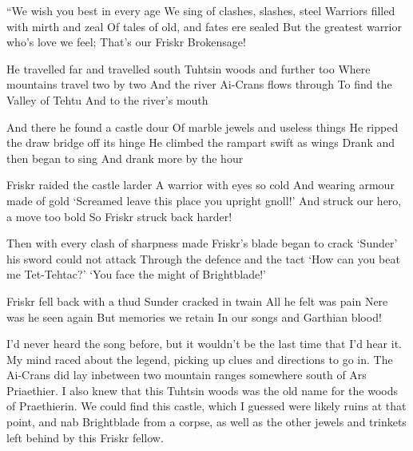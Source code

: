 \documentclass[12pt, a4paper]{book}
\begin{document}
\begin{poem}
\begin{stanza}
``We wish you best in every age\verseline
We sing of clashes, slashes, steel\verseline
Warriors filled with mirth and zeal\verseline
Of tales of old, and fates ere sealed\verseline
But the greatest warrior who's love we feel;\verseline
That's our Friskr Brokensage!
\end{stanza}
\begin{stanza}
He travelled far and travelled south\verseline
Tuhtsin woods and further too\verseline
Where mountains travel two by two\verseline
And the river Ai-Crans flows through\verseline
To find the Valley of Tehtu\verseline
And to the river's mouth
\end{stanza}
\begin{stanza}
And there he found a castle dour\verseline
Of marble jewels and useless things\verseline
He ripped the draw bridge off its hinge\verseline
He climbed the rampart swift as wings\verseline
Drank and then began to sing\verseline
And drank more by the hour
\end{stanza}
\begin{stanza}
Friskr raided the castle larder\verseline
A warrior with eyes so cold\verseline
And wearing armour made of gold\verseline
`Screamed leave this place you upright gnoll!'\verseline
And struck our hero, a move too bold\verseline
So Friskr struck back harder!
\end{stanza}
\begin{stanza}
Then with every clash of sharpness made\verseline
Friskr's blade began to crack\verseline
`Sunder' his sword could not attack\verseline
Through the defence and the tact\verseline
`How can you beat me Tet-Tehtac?'\verseline
`You face the might of Brightblade!'
\end{stanza}
\begin{stanza}
Friskr fell back with a thud\verseline
Sunder cracked in twain\verseline
All he felt was pain\verseline
Nere was he seen again\verseline
But memories we retain\verseline
In our songs and Garthian blood!
\end{stanza}
\end{poem}

I'd never heard the song before, but it wouldn't be the last time that I'd hear it. My mind raced about the legend, picking up clues and directions to go in. The Ai-Crans did lay inbetween two mountain ranges somewhere south of Ars Priaethier. I also knew that this Tuhtsin woods was the old name for the woods of Praethierin. We could find this castle, which I guessed were likely ruins at that point, and nab Brightblade from a corpse, as well as the other jewels and trinkets left behind by this Friskr fellow.
\end{document}
